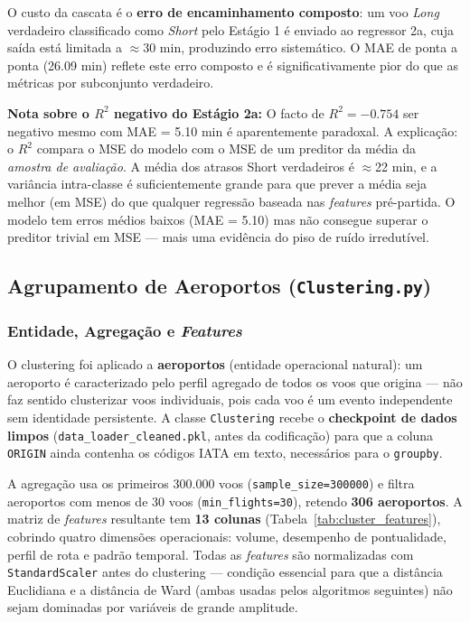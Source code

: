 \documentclass[conference]{IEEEtran}
\begin{document}
O custo da cascata é o \textbf{erro de encaminhamento composto}: um voo
\textit{Long} verdadeiro classificado como \textit{Short} pelo Estágio 1 é
enviado ao regressor 2a, cuja saída está limitada a $\approx$30 min, produzindo
erro sistemático. O MAE de ponta a ponta (26.09 min) reflete este erro composto
e é significativamente pior do que as métricas por subconjunto verdadeiro.

\noindent\textbf{Nota sobre o $R^2$ negativo do Estágio 2a:} O facto de
$R^2 = -0.754$ ser negativo mesmo com MAE = 5.10 min é aparentemente paradoxal.
A explicação: o $R^2$ compara o MSE do modelo com o MSE de um preditor da média
da \emph{amostra de avaliação}. A média dos atrasos Short verdadeiros é
$\approx$22 min, e a variância intra-classe é suficientemente grande para que
prever a média seja melhor (em MSE) do que qualquer regressão baseada nas
\textit{features} pré-partida. O modelo tem erros médios baixos (MAE = 5.10)
mas não consegue superar o preditor trivial em MSE — mais uma evidência do piso
de ruído irredutível.

\subsection{Agrupamento de Aeroportos (\texttt{Clustering.py})}

\subsubsection{Entidade, Agregação e \textit{Features}}
O clustering foi aplicado a \textbf{aeroportos} (entidade operacional natural):
um aeroporto é caracterizado pelo perfil agregado de todos os voos que
origina — não faz sentido clusterizar voos individuais, pois cada voo é um
evento independente sem identidade persistente. A classe \texttt{Clustering}
recebe o \textbf{checkpoint de dados limpos} (\texttt{data\_loader\_cleaned.pkl},
antes da codificação) para que a coluna \texttt{ORIGIN} ainda contenha os
códigos IATA em texto, necessários para o \texttt{groupby}.

A agregação usa os primeiros 300.000 voos (\texttt{sample\_size=300000}) e
filtra aeroportos com menos de 30 voos (\texttt{min\_flights=30}), retendo
\textbf{306 aeroportos}. A matriz de \textit{features} resultante tem
\textbf{13 colunas} (Tabela~\ref{tab:cluster_features}), cobrindo quatro
dimensões operacionais: volume, desempenho de pontualidade, perfil de rota e
padrão temporal. Todas as \textit{features} são normalizadas com
\texttt{StandardScaler} antes do clustering — condição essencial para que a
distância Euclidiana e a distância de Ward (ambas usadas pelos algoritmos
seguintes) não sejam dominadas por variáveis de grande amplitude.
\end{document}
